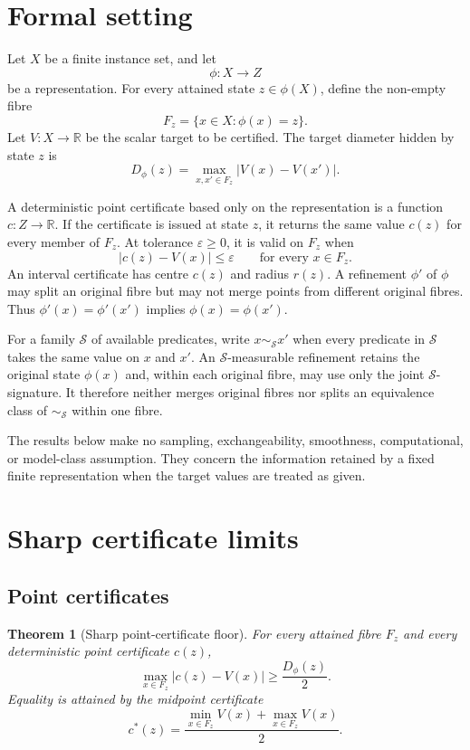 \documentclass[10pt]{article}
\newtheorem{theorem}{Theorem}
\newcommand{\R}{\mathbb{R}}
\newcommand{\1}{\mathbf{1}}
\begin{document}
\section{Formal setting}
Let $X$ be a finite instance set, and let
\[
  \phi:X\to Z
\]
be a representation. For every attained state $z\in\phi(X)$, define the non-empty fibre
\[
  F_z=\{x\in X:\phi(x)=z\}.
\]
Let $V:X\to\R$ be the scalar target to be certified. The target diameter hidden by state $z$ is
\[
  D_\phi(z)=\max_{x,x'\in F_z}|V(x)-V(x')|.
\]

A deterministic point certificate based only on the representation is a function $c:Z\to\R$. If the certificate is issued at state $z$, it returns the same value $c(z)$ for every member of $F_z$. At tolerance $\varepsilon\geq0$, it is valid on $F_z$ when
\[
  |c(z)-V(x)|\leq\varepsilon\qquad\text{for every }x\in F_z.
\]
An interval certificate has centre $c(z)$ and radius $r(z)$. A refinement $\phi'$ of $\phi$ may split an original fibre but may not merge points from different original fibres. Thus $\phi'(x)=\phi'(x')$ implies $\phi(x)=\phi(x')$.

For a family $\mathcal S$ of available predicates, write $x\sim_{\mathcal S}x'$ when every predicate in $\mathcal S$ takes the same value on $x$ and $x'$. An $\mathcal S$-measurable refinement retains the original state $\phi(x)$ and, within each original fibre, may use only the joint $\mathcal S$-signature. It therefore neither merges original fibres nor splits an equivalence class of $\sim_{\mathcal S}$ within one fibre.

The results below make no sampling, exchangeability, smoothness, computational, or model-class assumption. They concern the information retained by a fixed finite representation when the target values are treated as given.

\section{Sharp certificate limits}
\subsection{Point certificates}

\begin{theorem}[Sharp point-certificate floor]
For every attained fibre $F_z$ and every deterministic point certificate $c(z)$,
\[
  \max_{x\in F_z}|c(z)-V(x)|\geq\frac{D_\phi(z)}{2}.
\]
Equality is attained by the midpoint certificate
\[
  c^*(z)=\frac{\min_{x\in F_z}V(x)+\max_{x\in F_z}V(x)}{2}.
\]
\end{theorem}
\end{document}
